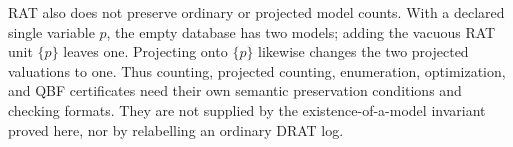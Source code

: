 RAT also does not preserve ordinary or projected model counts.  With a declared
single variable \(p\), the empty database has two models; adding the vacuous
RAT unit \(\{p\}\) leaves one.  Projecting onto \(\{p\}\) likewise
changes the two projected valuations to one.  Thus counting, projected
counting, enumeration, optimization, and QBF certificates need their own
semantic preservation conditions and checking formats.  They are not supplied
by the existence-of-a-model invariant proved here, nor by relabelling an
ordinary DRAT log.
